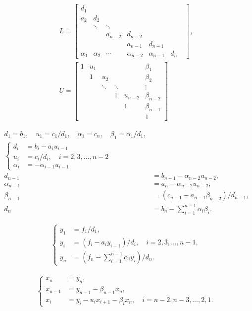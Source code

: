 \documentclass[a4paper,10pt]{article}
\begin{document}
\begin{align}
L = \begin{bmatrix}
d_1 & & & & & & \\
a_2 & d_2 & & & & & \\
& \ddots & \ddots & & & & \\
& & a_{n-2} & d_{n-2} & & & \\
& & & a_{n-1} & d_{n-1} & & \\
\alpha_1 & \alpha_2 & \cdots & \alpha_{n-2} & \alpha_{n-1} & d_n &
\end{bmatrix}, \\
U = \begin{bmatrix}
1 & u_1 & & & & \beta_1 \\
& 1 & u_2 & & & \beta_2 \\
& & \ddots & \ddots & & \vdots \\
& & & 1 & u_{n-2} & \beta_{n-2} \\
& & & & 1 &\beta_{n-1}\\
& & & & & 1
\end{bmatrix}
\end{align}


\begin{align}
d_1 = b_1, \quad u_1 = c_1/d_1, \quad \alpha_1 = c_n, \quad \beta_1 = \alpha_1/d_1, \\
\begin{cases}
    d_i &= b_i - a_i u_{i-1} \\
    u_i &= c_i/d_i , \quad i = 2,3,\dots,n-2\\
    \alpha_i &= -\alpha_{i-1}u_{i-1}
\end{cases} \\
d_{n-1} &= b_{n-1} - \alpha_{n-2}u_{n-2}, \\
\alpha_{n-1} &= a_n - \alpha_{n-2}u_{n-2}, \\
\beta_{n-1} &= (c_{n-1} - a_{n-1}\beta_{n-2})/d_{n-1}, \\
d_n &= b_n - \sum_{i=1}^{n-1}\alpha_i\beta_i.
\end{align}

\begin{align}
    \begin{cases}
        y_1 &= f_1/d_1, \\
        y_i &= (f_i - a_i y_{i-1})/d_i, \quad i = 2,3,\dots,n-1, \\
        y_n &= (f_n - \sum_{i=1}^{n-1}\alpha_i y_i)/d_n.
    \end{cases}
\end{align}

\begin{align}
    \begin{cases}
        x_n &= y_n, \\
        x_{n-1} &= y_{n-1} - \beta_{n-1}x_n, \\
        x_i &= y_i - u_ix_{i+1} - \beta_ix_n, \quad i = n-2,n-3,\dots,2,1.
    \end{cases}
\end{align}
\end{document}
